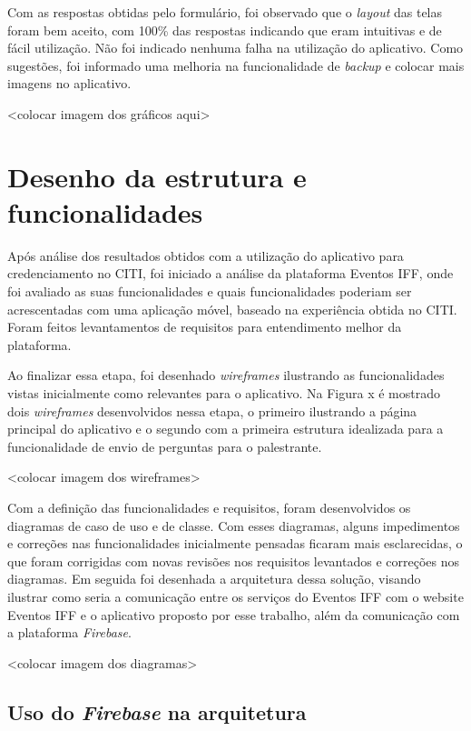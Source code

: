Com as respostas obtidas pelo formulário, foi observado que o \textit{layout} das telas foram bem aceito, com 100\% das respostas indicando que eram intuitivas e de fácil utilização. Não foi indicado nenhuma falha na utilização do aplicativo. Como sugestões, foi informado uma melhoria na funcionalidade de \textit{backup} e colocar mais imagens no aplicativo.

<colocar imagem dos gráficos aqui>

\section{Desenho da estrutura e funcionalidades}

Após análise dos resultados obtidos com a utilização do aplicativo para credenciamento no CITI, foi iniciado a análise da plataforma Eventos IFF, onde foi avaliado as suas funcionalidades e quais funcionalidades poderiam ser acrescentadas com uma aplicação móvel, baseado na experiência obtida no CITI. Foram feitos levantamentos de requisitos para entendimento melhor da plataforma. 

Ao finalizar essa etapa, foi desenhado \textit{wireframes} ilustrando as funcionalidades vistas inicialmente como relevantes para o aplicativo. Na Figura x é mostrado dois \textit{wireframes} desenvolvidos nessa etapa, o primeiro ilustrando a página principal do aplicativo e o segundo com a primeira estrutura idealizada para a funcionalidade de envio de perguntas para o palestrante.

<colocar imagem dos wireframes>

Com a definição das funcionalidades e requisitos, foram desenvolvidos os diagramas de caso de uso e de classe. Com esses diagramas, alguns impedimentos e correções nas funcionalidades inicialmente pensadas ficaram mais esclarecidas, o que foram corrigidas com novas revisões nos requisitos levantados e correções nos diagramas. Em seguida foi desenhada a arquitetura dessa solução, visando ilustrar como seria a comunicação entre os serviços do Eventos IFF com o website Eventos IFF e o aplicativo proposto por esse trabalho, além da comunicação com a plataforma \textit{Firebase}.

<colocar imagem dos diagramas>

\subsection{Uso do \textit{Firebase} na arquitetura}

